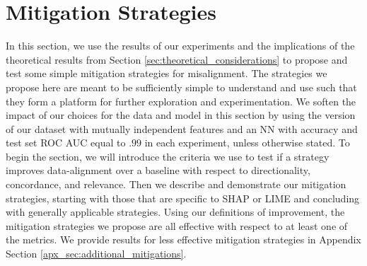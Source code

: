\documentclass[12pt]{article}  %
\begin{document}
\section{Mitigation Strategies}
    \label{sec:mitigation_strategies}
    In this section, we use the results of our experiments and the implications of the theoretical results from Section \ref{sec:theoretical_considerations} to propose and test some simple mitigation strategies for misalignment. The strategies we propose here are meant to be sufficiently simple to understand and use such that they form a platform for further exploration and experimentation. We soften the impact of our choices for the data and model in this section by using the version of our dataset with mutually independent features and an NN with accuracy and test set ROC AUC equal to $.99$ in each experiment, unless otherwise stated. To begin the section, we will introduce the criteria we use to test if a strategy improves data-alignment over a baseline with respect to directionality, concordance, and relevance. Then we describe and demonstrate our mitigation strategies, starting with those that are specific to SHAP or LIME and concluding with generally applicable strategies. Using our definitions of improvement, the mitigation strategies we propose are all effective with respect to at least one of the metrics. We provide results for less effective mitigation strategies in Appendix Section \ref{apx_sec:additional_mitigations}. 

    
\end{document}
